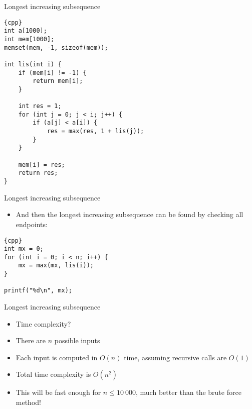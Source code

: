 \begin{frame}[fragile]{Longest increasing subsequence}
    \begin{lstlisting}[basicstyle=\footnotesize]{cpp}
int a[1000];
int mem[1000];
memset(mem, -1, sizeof(mem));

int lis(int i) {
    if (mem[i] != -1) {
        return mem[i];
    }

    int res = 1;
    for (int j = 0; j < i; j++) {
        if (a[j] < a[i]) {
            res = max(res, 1 + lis(j));
        }
    }

    mem[i] = res;
    return res;
}
    \end{lstlisting}
\end{frame}

\begin{frame}[fragile]{Longest increasing subsequence}

    \begin{itemize}
        \item And then the longest increasing subsequence can be found by checking all endpoints:
    \end{itemize}

    \begin{lstlisting}{cpp}
int mx = 0;
for (int i = 0; i < n; i++) {
    mx = max(mx, lis(i));
}

printf("%d\n", mx);
    \end{lstlisting}
\end{frame}

\begin{frame}[fragile]{Longest increasing subsequence}
    \begin{itemize}
        \item Time complexity?
        \item There are $n$ possible inputs
        \item Each input is computed in $O(n)$ time, assuming recursive calls are $O(1)$
        \item Total time complexity is $O(n^2)$
        \item This will be fast enough for $n \leq 10\ 000$, much better than the brute force method!
    \end{itemize}
\end{frame}


